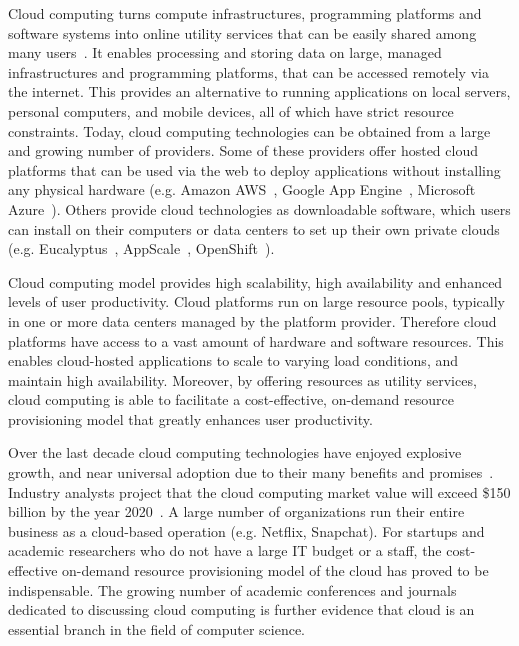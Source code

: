 Cloud computing turns compute infrastructures, programming platforms and software systems
into online utility services that can be easily shared among many users~\cite{hassan2011demystifying,Mell:2011:SND:2206223}.
It enables processing and storing data on large, managed infrastructures and 
programming platforms, that can be accessed remotely via the internet. This provides an
alternative to running applications on local servers, personal computers, and mobile devices,
all of which have strict resource constraints. 
Today, cloud computing technologies can be obtained from a large and growing number of providers.
Some of these providers offer hosted cloud platforms that can be used
via the web to deploy applications without installing any physical hardware 
(e.g. Amazon AWS~\cite{amazon-aws-web}, Google App Engine~\cite{gae}, Microsoft Azure~\cite{azure-web}). Others
provide cloud technologies as downloadable software, which users can install
on their computers or data centers to set up their own private clouds 
(e.g. Eucalyptus~\cite{eucalyptus09}, AppScale~\cite{6488671}, OpenShift~\cite{openshift}).

Cloud computing model provides high scalability, high availability and enhanced levels of 
user productivity. Cloud platforms run on large resource pools, typically in one or more
data centers managed by the platform provider. Therefore cloud platforms have access to a vast
amount of hardware and software resources. This enables cloud-hosted applications
to scale to varying load conditions, and maintain high availability. Moreover, by offering resources
as utility services, cloud computing is able to facilitate a cost-effective, on-demand
resource provisioning model that greatly enhances user productivity. 

Over the last decade cloud computing technologies have enjoyed explosive growth, 
and near universal adoption due to their many benefits and 
promises~\cite{Antonopoulos:2010:CCP:1855007,Pinheiro:2014:ACC:2618168.2618188}.
Industry analysts project that the cloud computing market value will exceed \$150 billion
by the year 2020~\cite{cloud-growth}.
A large number of organizations
run their entire business as a cloud-based operation (e.g. Netflix, Snapchat). For startups
and academic researchers who do not have a large IT budget or a staff, the cost-effective 
on-demand resource provisioning model of the cloud has proved to be indispensable.
The growing number of academic conferences and journals dedicated to discussing
cloud computing is further evidence that cloud is an essential branch in the field
of computer science.

